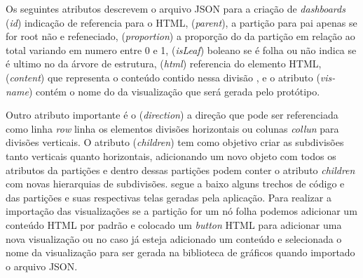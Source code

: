 \documentclass[
	12pt,				%
	openright,			%
	oneside,			%
	a4paper,			%
	english,			%
	brazil				%
	]{abntex2}
\begin{document}
Os seguintes atributos descrevem  o arquivo JSON para a criação de \textit{dashboards} (\textit{id}) indicação de referencia para o HTML,  (\textit{parent}), a partição para pai apenas se for root não e refeneciado, (\textit{proportion}) a proporção do da partição em relação ao total variando em numero entre 0 e 1, (\textit{isLeaf}) boleano se é folha ou não indica se é ultimo no da árvore de estrutura, (\textit{html}) referencia do elemento HTML,(\textit{content}) que representa o conteúdo contido nessa divisão , e o atributo (\textit{vis-name}) contém o nome do da visualização que será gerada pelo protótipo.

Outro atributo importante é o (\textit{direction}) a direção que pode ser referenciada como linha \textit{row} linha os elementos divisões horizontais ou colunas \textit{collun} para divisões verticais. O atributo (\textit{children}) tem como objetivo criar as subdivisões tanto verticais quanto horizontais, adicionando um novo objeto com todos os atributos da partições e dentro dessas partições podem conter o atributo \textit{children} com novas hierarquias de subdivisões. segue a baixo alguns trechos de código e das partições e suas respectivas telas geradas pela aplicação. Para realizar a importação das visualizações se a partição for um nó folha podemos adicionar um conteúdo HTML por padrão e colocado um \textit{button} HTML para adicionar uma nova visualização ou no caso já esteja adicionado um conteúdo e selecionada o nome da visualização para ser gerada na biblioteca de gráficos quando importado o arquivo JSON.
\end{document}

